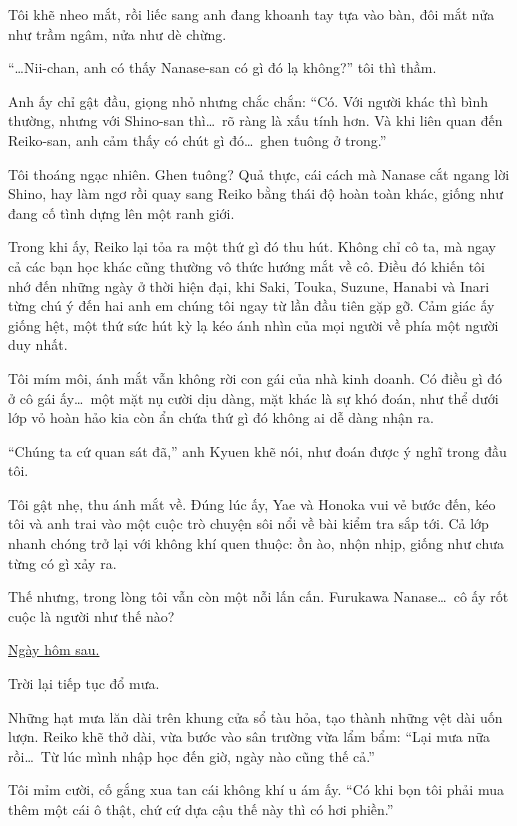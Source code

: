 \documentclass[../main.tex]{subfiles}
\begin{document}
Tôi khẽ nheo mắt, rồi liếc sang anh đang khoanh tay tựa vào bàn, đôi mắt nửa như trầm ngâm, nửa như dè chừng.

``\dots Nii-chan, anh có thấy Nanase-san có gì đó lạ không?'' tôi thì thầm.

Anh ấy chỉ gật đầu, giọng nhỏ nhưng chắc chắn: ``Có. Với người khác thì bình thường, nhưng với Shino-san thì\dots\ rõ ràng là xấu tính hơn. Và khi liên quan đến Reiko-san, anh cảm thấy có chút gì đó\dots\ ghen tuông ở trong.''

Tôi thoáng ngạc nhiên. Ghen tuông? Quả thực, cái cách mà Nanase cắt ngang lời Shino, hay làm ngơ rồi quay sang Reiko bằng thái độ hoàn toàn khác, giống như đang cố tình dựng lên một ranh giới.

Trong khi ấy, Reiko lại tỏa ra một thứ gì đó thu hút. Không chỉ cô ta, mà ngay cả các bạn học khác cũng thường vô thức hướng mắt về cô. Điều đó khiến tôi nhớ đến những ngày ở thời hiện đại, khi Saki, Touka, Suzune, Hanabi và Inari từng chú ý đến hai anh em chúng tôi ngay từ lần đầu tiên gặp gỡ. Cảm giác ấy giống hệt,  một thứ sức hút kỳ lạ kéo ánh nhìn của mọi người về phía một người duy nhất.

Tôi mím môi, ánh mắt vẫn không rời con gái của nhà kinh doanh. Có điều gì đó ở cô gái ấy\dots\ một mặt nụ cười dịu dàng, mặt khác là sự khó đoán, như thể dưới lớp vỏ hoàn hảo kia còn ẩn chứa thứ gì đó không ai dễ dàng nhận ra.

``Chúng ta cứ quan sát đã,'' anh Kyuen khẽ nói, như đoán được ý nghĩ trong đầu tôi.

Tôi gật nhẹ, thu ánh mắt về. Đúng lúc ấy, Yae và Honoka vui vẻ bước đến, kéo tôi và anh trai vào một cuộc trò chuyện sôi nổi về bài kiểm tra sắp tới. Cả lớp nhanh chóng trở lại với không khí quen thuộc: ồn ào, nhộn nhịp, giống như chưa từng có gì xảy ra.

Thế nhưng, trong lòng tôi vẫn còn một nỗi lấn cấn. Furukawa Nanase\dots\ cô ấy rốt cuộc là người như thế nào?

\begin{center}
  \uline{Ngày hôm sau.}
\end{center}

Trời lại tiếp tục đổ mưa.

Những hạt mưa lăn dài trên khung cửa sổ tàu hỏa, tạo thành những vệt dài uốn lượn. Reiko khẽ thở dài, vừa bước vào sân trường vừa lẩm bẩm: ``Lại mưa nữa rồi\dots\ Từ lúc mình nhập học đến giờ, ngày nào cũng thế cả.''

Tôi mỉm cười, cố gắng xua tan cái không khí u ám ấy. ``Có khi bọn tôi phải mua thêm một cái ô thật, chứ cứ dựa cậu thế này thì có hơi phiền.''
\end{document}
